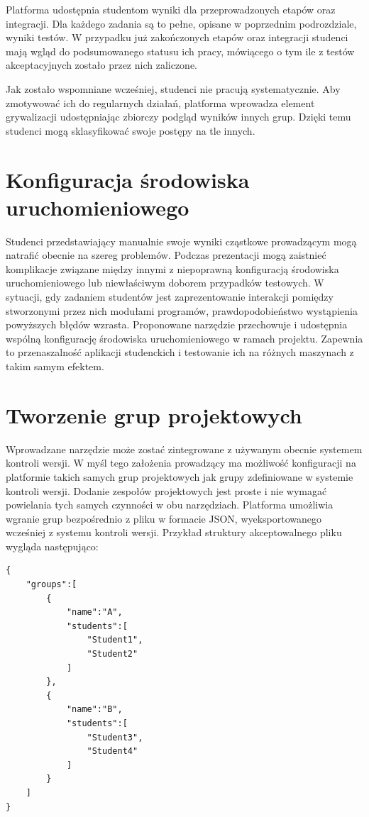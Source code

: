 Platforma udostępnia studentom wyniki dla przeprowadzonych etapów oraz integracji.
Dla każdego zadania są to pełne, opisane w poprzednim podrozdziale, wyniki testów.
W przypadku już zakończonych etapów oraz integracji studenci mają wgląd do podsumowanego statusu ich pracy, mówiącego o tym ile z testów akceptacyjnych zostało przez nich zaliczone.

Jak zostało wspomniane wcześniej, studenci nie pracują systematycznie.
Aby zmotywować ich do regularnych działań, platforma wprowadza element grywalizacji udostępniając zbiorczy podgląd wyników innych grup.
Dzięki temu studenci mogą sklasyfikować swoje postępy na tle innych.


\section{Konfiguracja środowiska uruchomieniowego}

Studenci przedstawiający manualnie swoje wyniki cząstkowe prowadzącym mogą natrafić obecnie na szereg problemów.
Podczas prezentacji mogą zaistnieć komplikacje związane między innymi z niepoprawną konfiguracją środowiska uruchomieniowego lub niewłaściwym doborem przypadków testowych.
W sytuacji, gdy zadaniem studentów jest zaprezentowanie interakcji pomiędzy stworzonymi przez nich modułami programów, prawdopodobieństwo wystąpienia powyższych błędów wzrasta.
Proponowane narzędzie przechowuje i udostępnia wspólną konfigurację środowiska uruchomieniowego w ramach projektu.
Zapewnia to przenaszalność aplikacji studenckich i testowanie ich na różnych maszynach z takim samym efektem.


\section{Tworzenie grup projektowych}

Wprowadzane narzędzie może zostać zintegrowane z używanym obecnie systemem kontroli wersji.
W myśl tego założenia prowadzący ma możliwość konfiguracji na platformie takich samych grup projektowych jak grupy zdefiniowane w systemie kontroli wersji.
Dodanie zespołów projektowych jest proste i nie wymagać powielania tych samych czynności w obu narzędziach.
Platforma umożliwia wgranie grup bezpośrednio z pliku w formacie JSON, wyeksportowanego wcześniej z systemu kontroli wersji.
Przykład struktury akceptowalnego pliku wygląda następująco:

{\selectfont
\footnotesize
\begin{lstlisting}
{
    "groups":[
        {
            "name":"A",
            "students":[
                "Student1",
                "Student2"
            ]
        },
        {
            "name":"B",
            "students":[
                "Student3",
                "Student4"
            ]
        }
    ]
}
\end{lstlisting}
}


